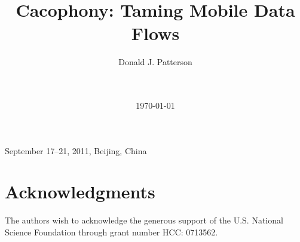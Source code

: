 \documentclass{chi2008}
\title{Cacophony: Taming Mobile Data Flows}
\author{
\alignauthor
Donald J. Patterson\\
       \affaddr{Department of Informatics}\\
       \affaddr{University of California, Irvine, USA}\\
       \email{ \{djp3\}@uci.edu}
}
\begin{document}
 {September 17--21, 2011, Beijing, China} 





\date{\today}

\maketitle







\section{Acknowledgments}
The authors wish to acknowledge the generous support of the U.S. National
Science Foundation through grant number HCC: 0713562.



\balancecolumns
\end{document}
